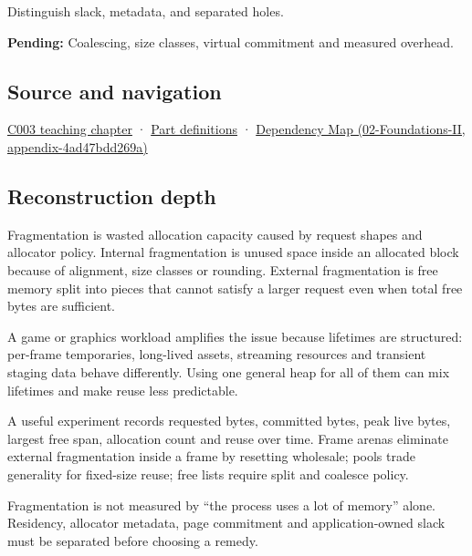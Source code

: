 Distinguish slack, metadata, and separated holes.

\textbf{Pending:} Coalescing, size classes, virtual commitment and measured overhead.

\subsection{Source and navigation}\label{appendix-a7c50686d81f-source-and-navigation}

\hyperref[01-foundations-i-ch002-where-the-bytes-live]{C003 teaching chapter} · \hyperref[appendix-fd090d982a15-m003---parts-41-60]{Part definitions} · \href{../02-Foundations-II/main.pdf\#nameddest=appendix-4ad47bdd269a}{Dependency Map (02-Foundations-II, appendix-4ad47bdd269a)}

\subsection{Reconstruction depth}\label{appendix-a7c50686d81f-reconstruction-depth}

Fragmentation is wasted allocation capacity caused by request shapes and allocator policy. Internal fragmentation is unused space inside an allocated block because of alignment, size classes or rounding. External fragmentation is free memory split into pieces that cannot satisfy a larger request even when total free bytes are sufficient.

A game or graphics workload amplifies the issue because lifetimes are structured: per-frame temporaries, long-lived assets, streaming resources and transient staging data behave differently. Using one general heap for all of them can mix lifetimes and make reuse less predictable.

A useful experiment records requested bytes, committed bytes, peak live bytes, largest free span, allocation count and reuse over time. Frame arenas eliminate external fragmentation inside a frame by resetting wholesale; pools trade generality for fixed-size reuse; free lists require split and coalesce policy.

Fragmentation is not measured by ``the process uses a lot of memory'' alone. Residency, allocator metadata, page commitment and application-owned slack must be separated before choosing a remedy.
